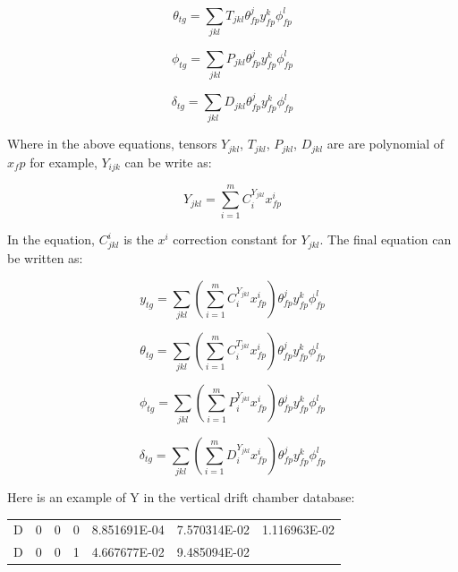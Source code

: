 \begin{equation}
    \theta_{tg} = \sum_{jkl}T_{jkl}\theta^j_{fp}y^k_{fp}\phi^l_{fp}
\end{equation}


\begin{equation}
    \phi_{tg} = \sum_{jkl}P_{jkl}\theta^j_{fp}y^k_{fp}\phi^l_{fp}
\end{equation}


\begin{equation}
    \delta_{tg} = \sum_{jkl}D_{jkl}\theta^j_{fp}y^k_{fp}\phi^l_{fp}
\end{equation}

Where in the above equations, tensors $Y_{jkl}$, $T_{jkl}$, $P_{jkl}$, $D_{jkl}$ are are polynomial of $x_fp$ for example, $Y_{ijk}$ can be write as:

\begin{equation}
    Y_{jkl} = \sum^m_{i=1}C_i^{Y_{jkl}}x^i_{fp}
\end{equation}

In the equation, $C^i_{jkl}$ is the $x^i$ correction constant for $Y_{jkl}$. The final equation can be written as:

\begin{equation}
    y_{tg} = \sum_{jkl} (\sum^m_{i=1}C_i^{Y_{jkl}}x^i_{fp}) \theta^j_{fp}y^k_{fp}\phi^l_{fp}
\end{equation}


\begin{equation}
    \theta_{tg} = \sum_{jkl}(\sum^m_{i=1}C_i^{T_{jkl}}x^i_{fp})\theta^j_{fp}y^k_{fp}\phi^l_{fp}
\end{equation}


\begin{equation}
    \phi_{tg} = \sum_{jkl}(\sum^m_{i=1}P_i^{Y_{jkl}}x^i_{fp})\theta^j_{fp}y^k_{fp}\phi^l_{fp}
\end{equation}


\begin{equation}
    \delta_{tg} = \sum_{jkl}(\sum^m_{i=1}D_i^{Y_{jkl}}x^i_{fp})\theta^j_{fp}y^k_{fp}\phi^l_{fp}
\end{equation}

Here is an example of Y in the vertical drift chamber database:

\begin{center}
    \begin{tabular}{c c c c c c c }
        D& 0& 0& 0&  8.851691E-04& 7.570314E-02& 1.116963E-02\\
        D& 0& 0& 1&  4.667677E-02& 9.485094E-02&
    \end{tabular}    
\end{center}

